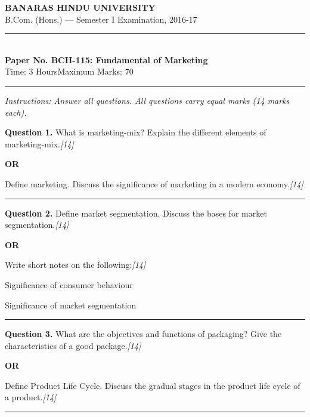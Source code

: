 \documentclass[11pt,a4paper]{article}
\newcommand{\pts}[1]{\hfill   \textit{[#1]}}
\begin{document}
\begin{center}
  {\large\bfseries BANARAS HINDU UNIVERSITY}\\[2pt]
  {\normalsize B.Com. (Hons.) --- Semester I Examination, 2016-17}\\[6pt]
  \rule{0.8\linewidth}{0.5pt}\\[6pt]
  {\large\bfseries Paper No. BCH-115: Fundamental of Marketing}\\[4pt]
  {\normalsize Time: 3 Hours\hfill Maximum Marks: 70}
\end{center}

\rule{\linewidth}{0.4pt}

\smallskip



\noindent   \textit{Instructions: Answer all questions. All questions carry equal marks (14 marks each).}

\bigskip




\noindent   \textbf{Question 1.}
What is marketing-mix? Explain the different elements of marketing-mix.\pts{14}

\centerline{   \textbf{OR}}

Define marketing. Discuss the significance of marketing in a modern economy.\pts{14}

\medskip\rule{\linewidth}{0.2pt}




\noindent   \textbf{Question 2.}
Define market segmentation. Discuss the bases for market segmentation.\pts{14}

\centerline{   \textbf{OR}}

Write short notes on the following:\pts{14}

\begin{parts}
  \item Significance of consumer behaviour
  \item Significance of market segmentation
\end{parts}

\medskip\rule{\linewidth}{0.2pt}




\noindent   \textbf{Question 3.}
What are the objectives and functions of packaging? Give the characteristics of a good package.\pts{14}

\centerline{   \textbf{OR}}

Define Product Life Cycle. Discuss the gradual stages in the product life cycle of a product.\pts{14}

\medskip\rule{\linewidth}{0.2pt}
\end{document}
